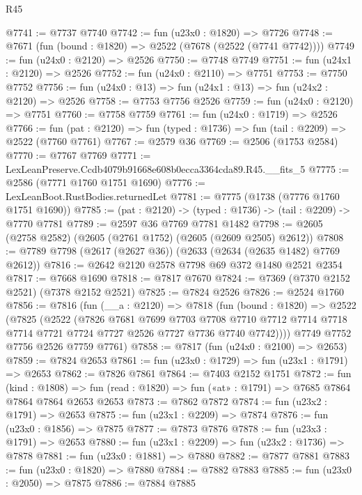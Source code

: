 \begin{lexlean}{R45}
\begin{coremodule}
@7741 := @7737 @7740
@7742 := fun (u23x0 : @1820) => @7726
@7748 := @7671 (fun (bound : @1820) => @2522 (@7678 (@2522 (@7741 @7742))))
@7749 := fun (u24x0 : @2120) => @2526
@7750 := @7748 @7749
@7751 := fun (u24x1 : @2120) => @2526
@7752 := fun (u24x0 : @2110) => @7751
@7753 := @7750 @7752
@7756 := fun (u24x0 : @13) => fun (u24x1 : @13) => fun (u24x2 : @2120) => @2526
@7758 := @7753 @7756 @2526
@7759 := fun (u24x0 : @2120) => @7751
@7760 := @7758 @7759
@7761 := fun (u24x0 : @1719) => @2526
@7766 := fun (pat : @2120) => fun (typed : @1736) => fun (tail : @2209) => @2522 (@7760 @7761)
@7767 := @2579 @36
@7769 := @2506 (@1753 @2584)
@7770 := @7767 @7769
@7771 := LexLeanPreserve.Ccdb4079b91668e608b0ecca3364cda89.R45.__fits_5
@7775 := @2586 (@7771 @1760 @1751 @1690)
@7776 := LexLeanBoot.RustBodies.returnedLet
@7781 := @7775 (@1738 (@7776 @1760 @1751 @1690))
@7785 := (pat : @2120) -> (typed : @1736) -> (tail : @2209) -> @7770 @7781
@7789 := @2597 @36 @7769 @7781 @1482
@7798 := @2605 (@2758 @2582) (@2605 (@2761 @1752) (@2605 (@2609 @2505) @2612))
@7808 := @7789 @7798 (@2617 (@2627 @36)) (@2633 (@2634 (@2635 @1482) @7769 @2612))
@7816 := @2642 @2120 @2578 @7798 @69 @372 @1480 @2521 @2354
@7817 := @7668 @1690
@7818 := @7817 @7670
@7824 := @7369 (@7370 @2152 @2521) (@7378 @2152 @2521)
@7825 := @7824 @2526
@7826 := @2524 @1760
@7856 := @7816
    (fun (__a : @2120) =>
    @7818
      (fun (bound : @1820) =>
      @2522
        (@7825
          (@2522
            (@7826
              @7681
              @7699
              @7703
              @7708
              @7710
              @7712
              @7714
              @7718
              @7714
              @7721
              @7724
              @7727
              @2526
              @7727
              @7736
              @7740
              @7742))))
      @7749
      @7752
      @7756
      @2526
      @7759
      @7761)
@7858 := @7817 (fun (u24x0 : @2100) => @2653)
@7859 := @7824 @2653
@7861 := fun (u23x0 : @1729) => fun (u23x1 : @1791) => @2653
@7862 := @7826 @7861
@7864 := @7403 @2152 @1751
@7872 := fun (kind : @1808) =>
  fun (read : @1820) => fun («at» : @1791) => @7685 @7864 @7864 @7864 @2653 @2653
@7873 := @7862 @7872
@7874 := fun (u23x2 : @1791) => @2653
@7875 := fun (u23x1 : @2209) => @7874
@7876 := fun (u23x0 : @1856) => @7875
@7877 := @7873 @7876
@7878 := fun (u23x3 : @1791) => @2653
@7880 := fun (u23x1 : @2209) => fun (u23x2 : @1736) => @7878
@7881 := fun (u23x0 : @1881) => @7880
@7882 := @7877 @7881
@7883 := fun (u23x0 : @1820) => @7880
@7884 := @7882 @7883
@7885 := fun (u23x0 : @2050) => @7875
@7886 := @7884 @7885

\end{coremodule}
\end{lexlean}
